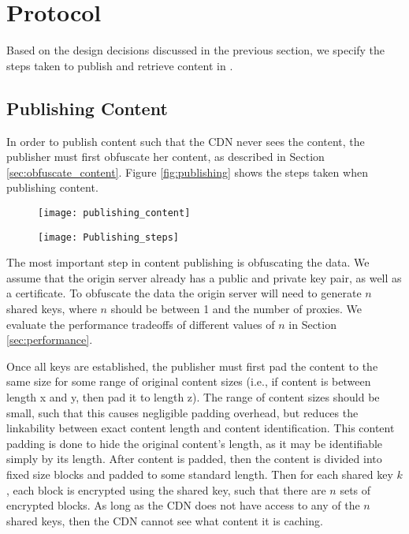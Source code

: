 \section{\system{} Protocol}
\label{sec:protocol}
Based on the design decisions discussed in the previous section, we specify the 
steps taken to publish and retrieve content in \system{}.

\subsection{Publishing Content}
\label{sec:publish_protocol}
In order to publish content such that the CDN never sees the content, the publisher 
must first obfuscate her content, as described in Section \ref{sec:obfuscate_content}. 
Figure \ref{fig:publishing} shows the steps taken when publishing content.

\begin{figure*}[t]
    \centering
    \begin{subfigure}[h]{0.5\textwidth}
        \texttt{[image: publishing\_content]}
    \end{subfigure}%
    \begin{subfigure}[h]{0.5\textwidth}
        \texttt{[image: Publishing\_steps]}
    \end{subfigure}
    \caption{Step-by-step instructions on how content is published in \system{}.}
    \label{fig:publishing}
\end{figure*}

The most important step in content publishing is obfuscating the data.  We assume that the origin 
server already has a public and private key pair, as well as a certificate.  To obfuscate the data 
the origin server will need to generate $n$ shared keys, where $n$ should be between 1 and the number of 
proxies.  We evaluate the performance tradeoffs of different values of $n$ in Section \ref{sec:performance}.  

Once all keys are established, the publisher must first pad the content to the same size for some 
range of original content sizes (i.e., if content is between length x and y, then pad it to length 
z).  The range of content sizes should be small, such that this causes negligible padding overhead, but 
reduces the linkability between exact content length and content identification.  This content padding is done to hide the original content's length, as it may be identifiable 
simply by its length.  After content is padded, then the content is divided into fixed size blocks and padded to 
some standard length.  Then for each shared key $k$, each block is encrypted using the shared key, 
such that there are $n$ sets of encrypted blocks. As long as the CDN does not have access to any 
of the $n$ shared keys, then the CDN cannot see what content it is caching.  

